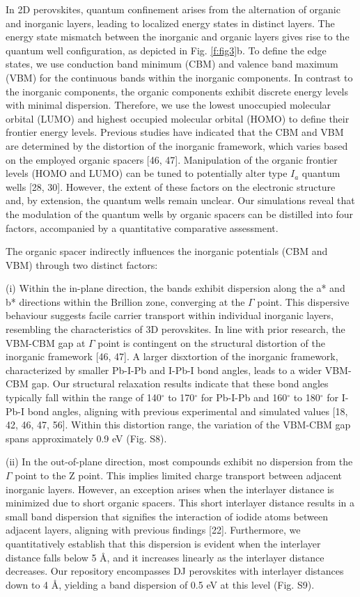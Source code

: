 In 2D perovskites, quantum confinement arises from the alternation of organic and inorganic layers, leading to localized energy states in distinct layers. The energy state mismatch between the inorganic and organic layers gives rise to the quantum well configuration, as depicted in Fig. \ref{f:fig3}b. To define the edge states, we use conduction band minimum (CBM) and valence band maximum (VBM) for the continuous bands within the inorganic components. In contrast to the inorganic components, the organic components exhibit discrete energy levels with minimal dispersion. Therefore, we use the lowest unoccupied molecular orbital (LUMO) and highest occupied molecular orbital (HOMO) to define their frontier energy levels. Previous studies have indicated that the CBM and VBM are determined by the distortion of the inorganic framework, which varies based on the employed organic spacers [46, 47]. Manipulation of the organic frontier levels (HOMO and LUMO) can be tuned to potentially alter type $I_a$ quantum wells [28, 30]. However, the extent of these factors on the electronic structure and, by extension, the quantum wells remain unclear. Our simulations reveal that the modulation of the quantum wells by organic spacers can be distilled into four factors, accompanied by a quantitative comparative assessment.

The organic spacer indirectly influences the inorganic potentials (CBM and VBM) through two distinct factors:

(i) Within the in-plane direction, the bands exhibit dispersion along the a* and b* directions within the Brillion zone, converging at the $\Gamma$ point. This dispersive behaviour suggests facile carrier transport within individual inorganic layers, resembling the characteristics of 3D perovskites. In line with prior research, the VBM-CBM gap at $\Gamma$ point is contingent on the structural distortion of the inorganic framework [46, 47]. A larger disxtortion of the inorganic framework, characterized by smaller Pb-I-Pb and I-Pb-I bond angles, leads to a wider VBM-CBM gap. Our structural relaxation results indicate that these bond angles typically fall within the range of 140$^{\circ}$ to 170$^{\circ}$ for Pb-I-Pb and 160$^{\circ}$ to 180$^{\circ}$ for I-Pb-I bond angles, aligning with previous experimental and simulated values [18, 42, 46, 47, 56]. Within this distortion range, the variation of the VBM-CBM gap spans approximately 0.9 eV (Fig. S8).

(ii) In the out-of-plane direction, most compounds exhibit no dispersion from the $\Gamma$ point to the Z point. This implies limited charge transport between adjacent inorganic layers. However, an exception arises when the interlayer distance is minimized due to short organic spacers. This short interlayer distance results in a small band dispersion that signifies the interaction of iodide atoms between adjacent layers, aligning with previous findings [22]. Furthermore, we quantitatively establish that this dispersion is evident when the interlayer distance falls below 5 {\AA}, and it increases linearly as the interlayer distance decreases. Our repository encompasses DJ perovskites with interlayer distances down to 4 {\AA}, yielding a band dispersion of 0.5 eV at this level (Fig. S9).

